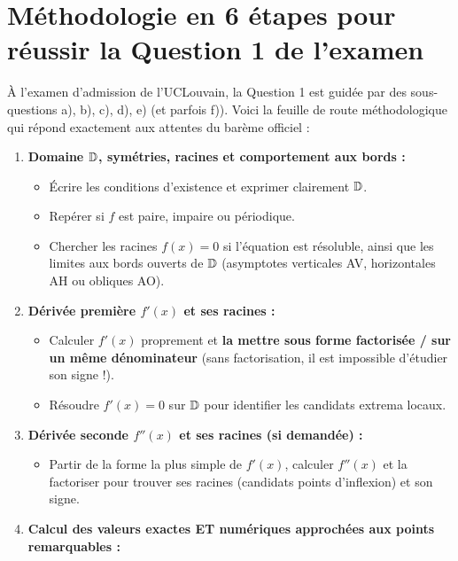 \section{Méthodologie en 6 étapes pour réussir la Question 1 de l'examen}

À l'examen d'admission de l'UCLouvain, la Question 1 est guidée par des sous-questions a), b), c), d), e) (et parfois f)). Voici la feuille de route méthodologique qui répond exactement aux attentes du barème officiel :

\begin{astuce}
\begin{enumerate}
    \item \textbf{Domaine $\mathbb{D}$, symétries, racines et comportement aux bords :}
    \begin{itemize}
        \item Écrire les conditions d'existence et exprimer clairement $\mathbb{D}$.
        \item Repérer si $f$ est paire, impaire ou périodique.
        \item Chercher les racines $f(x) = 0$ si l'équation est résoluble, ainsi que les limites aux bords ouverts de $\mathbb{D}$ (asymptotes verticales AV, horizontales AH ou obliques AO).
    \end{itemize}
    \item \textbf{Dérivée première $f'(x)$ et ses racines :}
    \begin{itemize}
        \item Calculer $f'(x)$ proprement et \textbf{la mettre sous forme factorisée / sur un même dénominateur} (sans factorisation, il est impossible d'étudier son signe !).
        \item Résoudre $f'(x) = 0$ sur $\mathbb{D}$ pour identifier les candidats extrema locaux.
    \end{itemize}
    \item \textbf{Dérivée seconde $f''(x)$ et ses racines (si demandée) :}
    \begin{itemize}
        \item Partir de la forme la plus simple de $f'(x)$, calculer $f''(x)$ et la factoriser pour trouver ses racines (candidats points d'inflexion) et son signe.
    \end{itemize}
    \item \textbf{Calcul des valeurs exactes ET numériques approchées aux points remarquables :}

\end{enumerate}
\end{astuce}
